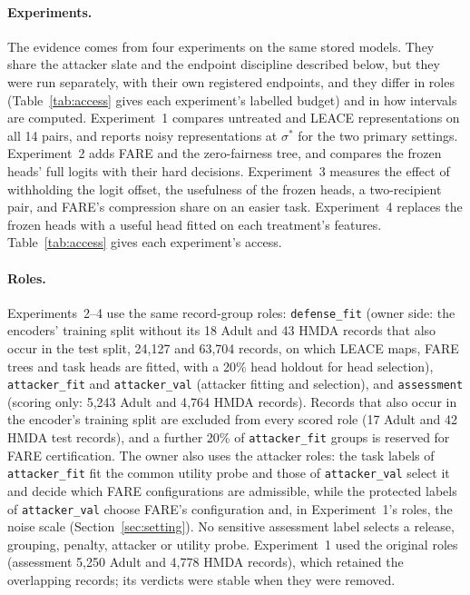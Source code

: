 \documentclass[10pt]{article}
\begin{document}
\paragraph{Experiments.} The evidence comes from four experiments on the same stored models. They share the attacker
slate and the endpoint discipline described below, but they were run separately, with their own registered endpoints,
and they differ in roles (Table~\ref{tab:access} gives each experiment's labelled budget) and in how intervals are
computed. Experiment~1 compares untreated and LEACE representations on all 14 pairs, and reports noisy representations at $\sigma^*$ for the two primary settings. Experiment~2 adds FARE and the zero-fairness tree, and compares the frozen
heads' full logits with their hard decisions. Experiment~3 measures the effect of withholding the logit offset, the
usefulness of the frozen heads, a two-recipient pair, and FARE's compression share on an easier task. Experiment~4
replaces the frozen heads with a useful head fitted on each treatment's features. Table~\ref{tab:access} gives each
experiment's access.

\paragraph{Roles.} Experiments~2--4 use the same record-group roles: \texttt{defense\_fit} (owner side: the encoders' training split without its 18 Adult and 43
HMDA records that also occur in the test split, 24{,}127 and 63{,}704 records, on which LEACE maps, FARE trees and task
heads are fitted,
with a 20\% head holdout for head selection), \texttt{attacker\_fit} and \texttt{attacker\_val}
(attacker fitting and selection), and \texttt{assessment} (scoring only: 5{,}243 Adult and 4{,}764 HMDA records).
Records that also occur in the encoder's training split are excluded from every scored role (17 Adult and 42 HMDA test
records), and a further 20\% of \texttt{attacker\_fit} groups is reserved for FARE certification. The owner also uses
the attacker roles: the task labels of \texttt{attacker\_fit} fit the common utility probe and those of
\texttt{attacker\_val} select it and decide which FARE configurations are admissible, while the protected labels of
\texttt{attacker\_val} choose FARE's configuration and, in Experiment~1's roles, the noise scale
(Section~\ref{sec:setting}). No sensitive
assessment label selects a release, grouping, penalty, attacker or utility probe. Experiment~1 used the original roles (assessment 5{,}250 Adult and 4{,}778 HMDA records), which retained
the overlapping records; its verdicts were stable when they were removed.
\end{document}

